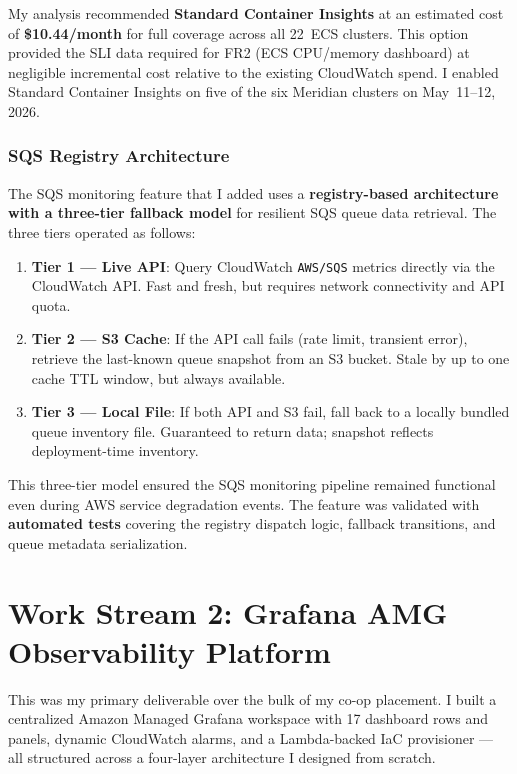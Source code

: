 My analysis recommended \textbf{Standard Container Insights} at an estimated
cost of \textbf{\$10.44/month} for full coverage across all 22~ECS clusters.
This option provided the SLI data required for FR2 (ECS CPU/memory dashboard)
at negligible incremental cost relative to the existing CloudWatch spend.
I enabled Standard Container Insights on five of the six Meridian clusters
on May~11--12, 2026.

\subsubsection{SQS Registry Architecture}

The SQS monitoring feature that I added uses a
\textbf{registry-based architecture with a three-tier fallback model} for
resilient SQS queue data retrieval. The three tiers operated as follows:

\begin{enumerate}
    \item \textbf{Tier 1 --- Live API}: Query CloudWatch
          \texttt{AWS/SQS} metrics directly via the CloudWatch API. Fast
          and fresh, but requires network connectivity and API quota.

    \item \textbf{Tier 2 --- S3 Cache}: If the API call fails (rate
          limit, transient error), retrieve the last-known queue snapshot
          from an S3 bucket. Stale by up to one cache TTL window, but
          always available.

    \item \textbf{Tier 3 --- Local File}: If both API and S3 fail, fall
          back to a locally bundled queue inventory file. Guaranteed to
          return data; snapshot reflects deployment-time inventory.
\end{enumerate}

This three-tier model ensured the SQS monitoring pipeline remained
functional even during AWS service degradation events. The feature
was validated with \textbf{automated tests} covering the registry
dispatch logic, fallback transitions, and queue metadata serialization.

\FloatBarrier

\section{Work Stream 2: Grafana AMG Observability Platform}
\label{sec:grafana_amg_platform}


This was my primary deliverable over the bulk of my co-op placement.
I built a centralized Amazon Managed Grafana workspace with 17 dashboard rows and panels,
dynamic CloudWatch alarms, and a Lambda-backed IaC provisioner --- all structured
across a four-layer architecture I designed from scratch.

